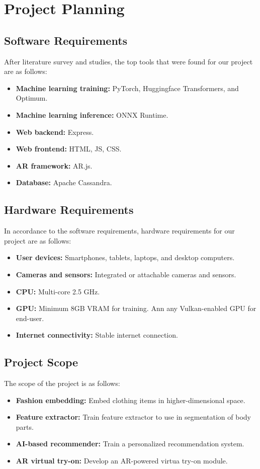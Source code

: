 \chapter{Project Planning}

\section{Software Requirements}
	After literature survey and studies, the top tools that were found for our project are as follows:

	\begin{itemize}
		\item \textbf{Machine learning training:} PyTorch, Huggingface Transformers, and Optimum.
		\item \textbf{Machine learning inference:} ONNX Runtime.
		\item \textbf{Web backend:} Express.
		\item \textbf{Web frontend:} HTML, JS, CSS.
		\item \textbf{AR framework:} AR.js.
		\item \textbf{Database:} Apache Cassandra.
	\end{itemize}

\section{Hardware Requirements}
	In accordance to the software requirements, hardware requirements for our project are as follows:

	\begin{itemize}
		\item \textbf{User devices:} Smartphones, tablets, laptops, and desktop computers.
		\item \textbf{Cameras and sensors:} Integrated or attachable cameras and sensors.
		\item \textbf{CPU:} Multi-core 2.5 GHz.
		\item \textbf{GPU:} Minimum 8GB VRAM for training. Ann any Vulkan-enabled GPU for end-user.
		\item \textbf{Internet connectivity:} Stable internet connection.
	\end{itemize}

\section{Project Scope}
	The scope of the project is as follows:
	
	\begin{itemize}
		\item \textbf{Fashion embedding:} Embed clothing items in higher-dimensional space.
		\item \textbf{Feature extractor:} Train feature extractor to use in segmentation of body parts.
		\item \textbf{AI-based recommender:} Train a personalized recommendation system.
		\item \textbf{AR virtual try-on:} Develop an AR-powered virtua try-on module.
	\end{itemize}

